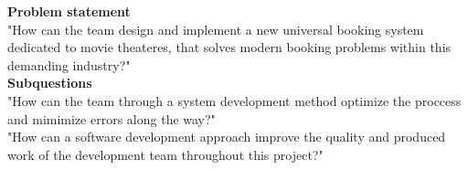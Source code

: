 \textbf{Problem statement} \\
"How can the team design and implement a new universal booking system dedicated to movie theateres, 
that solves modern booking problems within this demanding industry?" \\

\textbf{Subquestions} \\
"How can the team through a system development method optimize the proccess and mimimize errors along the way?" \\

"How can a software development approach improve the quality and produced work of the development team throughout this project?"
















